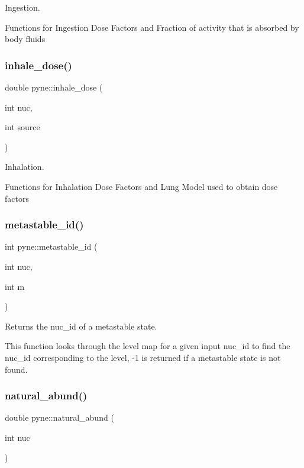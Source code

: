 Ingestion. 

Functions for Ingestion Dose Factors and Fraction of activity that is absorbed by body fluids \mbox{\label{namespacepyne_ab1b598dc77d5c5f0c33f4d3d6d14a454}} 
\subsubsection{\texorpdfstring{inhale\+\_\+dose()}{inhale\_dose()}}
{\footnotesize\ttfamily double pyne\+::inhale\+\_\+dose (\begin{DoxyParamCaption}\item[{int}]{nuc,  }\item[{int}]{source }\end{DoxyParamCaption})}



Inhalation. 

Functions for Inhalation Dose Factors and Lung Model used to obtain dose factors \mbox{\label{namespacepyne_a2e817a4d6dac740b6fa883ac99272201}} 
\subsubsection{\texorpdfstring{metastable\+\_\+id()}{metastable\_id()}}
{\footnotesize\ttfamily int pyne\+::metastable\+\_\+id (\begin{DoxyParamCaption}\item[{int}]{nuc,  }\item[{int}]{m }\end{DoxyParamCaption})}



Returns the nuc\+\_\+id of a metastable state. 

This function looks through the level map for a given input nuc\+\_\+id to find the nuc\+\_\+id corresponding to the level, -\/1 is returned if a metastable state is not found. \mbox{\label{namespacepyne_aa34a8311add97b0e90ce7600aa86f000}} 
\subsubsection{\texorpdfstring{natural\+\_\+abund()}{natural\_abund()}}
{\footnotesize\ttfamily double pyne\+::natural\+\_\+abund (\begin{DoxyParamCaption}\item[{int}]{nuc }\end{DoxyParamCaption})}



